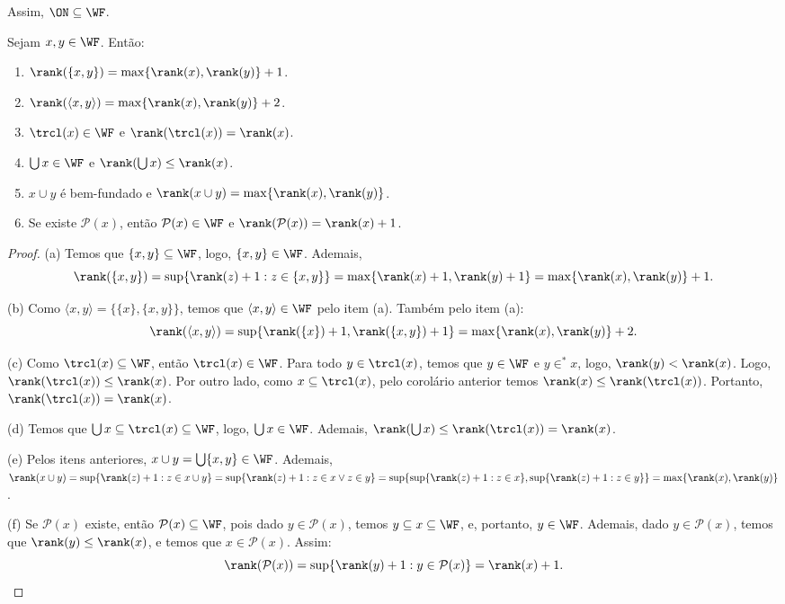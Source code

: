 Assim, $\ON\subseteq \WF$.

\begin{corollary}[$\ZFmP$]
    Sejam $x, y\in \WF$.
    Então:
    \begin{enumerate}[label=(\alph*)]
        \item $\rank(\{x, y\})=\max\{\rank(x), \rank(y)\}+1$.
        \item $\rank(\langle x, y\rangle)=\max\{\rank(x), \rank(y)\}+2$.
        \item $\trcl(x)\in \WF$ e $\rank(\trcl(x))=\rank(x)$.
        \item $\bigcup x\in \WF$ e $\rank(\bigcup x)\leq \rank(x)$.
        \item $x\cup y$ é bem-fundado e $\rank(x\cup y)=\max\{\rank(x), \rank(y)\}$.
        \item Se existe $\mathcal P(x)$, então $\mathcal P(x)\in \WF$ e $\rank(\mathcal P(x))=\rank(x)+1$.
    \end{enumerate}
\end{corollary}

\begin{proof}
    (a) Temos que $\{x, y\}\subseteq \WF$, logo, $\{x, y\}\in \WF$.
    Ademais,
    \[
        \rank(\{x, y\})=\sup\{\rank(z)+1: z\in \{x, y\}\}=\max\{\rank(x)+1, \rank(y)+1\}=\max\{\rank(x), \rank(y)\}+1.
    \]

    (b) Como $\langle x, y\rangle=\{\{x\}, \{x, y\}\}$, temos que $\langle x, y\rangle\in \WF$ pelo item (a).
    Também pelo item (a):
    \[
        \rank(\langle x, y\rangle)=\sup\{\rank(\{x\})+1, \rank(\{x, y\})+1\}=\max\{\rank(x), \rank(y)\}+2.
    \]

    (c) Como $\trcl(x)\subseteq \WF$, então $\trcl(x)\in \WF$.
    Para todo $y \in \trcl(x)$, temos que $y\in \WF$ e $y\in^* x$, logo, $\rank(y)<\rank(x)$.
    Logo, $\rank(\trcl(x))\leq \rank(x)$.
    Por outro lado, como $x\subseteq \trcl(x)$, pelo corolário anterior temos $\rank(x)\leq \rank(\trcl(x))$.
    Portanto, $\rank(\trcl(x))=\rank(x)$.

    (d) Temos que $\bigcup x\subseteq \trcl(x)\subseteq \WF$, logo, $\bigcup x\in \WF$.
    Ademais, $\rank(\bigcup x)\leq\rank(\trcl(x))=\rank(x)$.

    (e) Pelos itens anteriores, $x\cup y=\bigcup\{x, y\}\in \WF$.
    Ademais, $\rank(x\cup y)=\sup\{\rank(z)+1: z\in x\cup y\}=\sup\{\rank(z)+1: z\in x \vee z\in y\}=\sup\{\sup\{\rank(z)+1: z\in x\}, \sup\{\rank(z)+1: z\in y\}\}=\max\{\rank(x), \rank(y)\}$.

    (f) Se $\mathcal P(x)$ existe, então $\mathcal P(x)\subseteq \WF$, pois dado $y \in \mathcal P(x)$, temos $y\subseteq x\subseteq \WF$, e, portanto, $y\in \WF$.
    Ademais, dado $y\in \mathcal P(x)$, temos que $\rank(y)\leq \rank(x)$, e temos que $x\in \mathcal P(x)$.
    Assim:
    \[
        \rank(\mathcal P(x))=\sup\{\rank(y)+1: y\in \mathcal P(x)\}=\rank(x)+1.
    \]
\end{proof}

